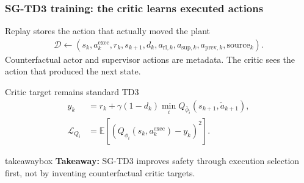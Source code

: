 \documentclass[aspectratio=169]{beamer}
\newcommand{\takeawaybox}[1]{%
\vspace{0.02cm}
\begin{center}
\begin{beamercolorbox}[wd=0.94\textwidth,sep=3pt,center,rounded=true,shadow=false]{takeawaybox}
\scriptsize
\textbf{\textcolor{maroon1}{Takeaway:}} #1
\end{beamercolorbox}
\end{center}
}
\begin{document}
\begin{frame}
\frametitle{\large \textbf{SG-TD3 training: the critic learns executed actions}}
\scriptsize

\begin{block}{Replay stores the action that actually moved the plant}
\begin{align*}
\mathcal{D}\leftarrow
\left(s_k,a_k^{\mathrm{exec}},r_k,s_{k+1},d_k,
a_{\mathrm{rl},k},a_{\mathrm{sup},k},a_{\mathrm{prev},k},\mathrm{source}_k\right).
\end{align*}
\vspace{-0.18cm}
Counterfactual actor and supervisor actions are metadata. The critic sees the action that produced the next state.
\end{block}

\begin{block}{Critic target remains standard TD3}
\begin{align*}
y_k &= r_k+\gamma(1-d_k)
\min_i Q_{\bar{\phi}_i}(s_{k+1},\tilde{a}_{k+1}),\\
\mathcal{L}_{Q_i}
&=\mathbb{E}\left[(Q_{\phi_i}(s_k,a_k^{\mathrm{exec}})-y_k)^2\right].
\end{align*}
\end{block}

\takeawaybox{SG-TD3 improves safety through execution selection first, not by inventing counterfactual critic targets.}
\end{frame}
\end{document}
